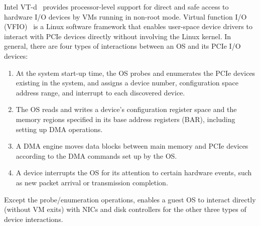Intel VT-d~\cite{intelvtd-paper} provides processor-level support for direct 
and safe access to hardware I/O devices by VMs running in non-root mode.
Virtual function I/O (VFIO)~\cite{vfio} is a Linux software framework that enables user-space
device drivers to interact with PCIe devices directly without involving the Linux kernel. 
In general, there are four types of interactions between an OS and its PCIe I/O devices:
\begin{enumerate} 
\parskip 0mm
\itemsep 0mm
\item At the system start-up time, the OS probes and enumerates the PCIe devices existing in the system, and assigns a device number, configuration space address range, and interrupt to each discovered device.

\item The OS reads and writes a device's configuration register space and the memory regions specified in its base address registers (BAR), including setting up DMA operations.

\item A DMA engine moves data blocks between main memory and PCIe devices according to the DMA commands set up by the OS.

\item A device interrupts the OS for its attention to certain hardware events, such as new packet arrival or transmission completion.

\end{enumerate}   
Except the probe/enumeration operations, 
\na enables a guest OS to interact directly (without VM exits) with NICs and disk controllers
for the other three types of device interactions. 

